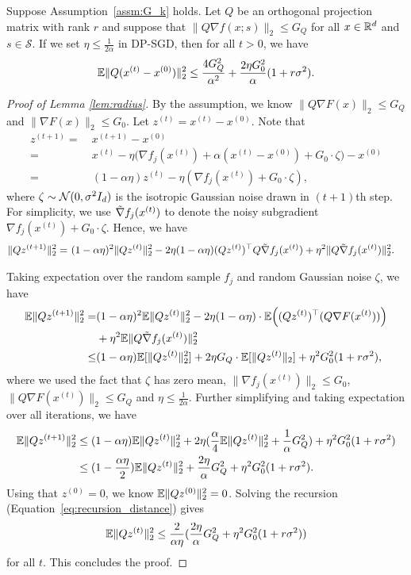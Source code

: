 \begin{lemm}
\label{lem:radius}
Suppose Assumption~\ref{assm:G_k} holds.
Let $Q$ be an orthogonal projection matrix with rank $r$ and suppose that $\|Q\nabla f(x;s)\|_2 \leq G_Q$ for all $x\in\mathbb{R}^d$ and $s \in \mathcal{S}$. 
If we set $\eta\leq\frac{1}{2\alpha}$ in DP-SGD, then for all $t>0$, we have
\[
\mathbb{E}\|Q(x^{(t)}-x^{(0)})\|_2^{2}\leq\frac{4 G_{Q}^{2}}{\alpha^{2}}+\frac{2\eta G_{0}^{2}}{\alpha}(1+r\sigma^{2}).
\]
\end{lemm}


\begin{proof}[Proof of Lemma \ref{lem:radius}]
By the assumption, we know $\|Q \nabla F(x)\|_2\le G_Q$ and $\| \nabla F(x)\|_2\leq G_0$.
Let $z^{(t)}=x^{(t)}-x^{(0)}$. Note that
\begin{align*}
    z^{(t+1)}=& ~ x^{(t+1)}-x^{(0)}\\
    =& ~ x^{(t)}-\eta\Big(\nabla f_j(x^{(t)})+\alpha(x^{(t)}-x^{(0)})+G_{0}\cdot \zeta\Big)-x^{(0)}\\
    =& ~ (1-\alpha\eta)z^{(t)}-\eta(\nabla f_{j}(x^{(t)})+G_{0}\cdot\zeta ),
\end{align*}
where $\zeta\sim \mathcal N(0,\sigma^{2}I_d)$ is the isotropic Gaussian noise drawn in $(t+1)$th step. 
For simplicity, we use $\Tilde{\nabla} f_j(x^{(t)})$ to denote the noisy subgradient $\nabla f_{j}(x^{(t)})+G_{0}\cdot\zeta$.
Hence, we have
\begin{align*}
    \|Qz^{(t+1)}\|_2^2=& ~ (1-\alpha\eta)^2\|Qz^{(t)}\|_2^2-2\eta(1-\alpha\eta)( Qz^{(t)})^\top Q\Tilde{\nabla} f_j(x^{(t)})+\eta^2\|Q\Tilde{\nabla} f_j(x^{(t)})\|_2^2.
\end{align*}

Taking expectation over the random sample $f_j$ and random Gaussian noise $\zeta$, we have
\begin{align*}
\mathbb{E}\|Qz^{(t+1)}\|_{2}^{2}= & (1-\alpha\eta)^{2}\mathbb{E}\|Qz^{(t)}\|_{2}^{2}-2\eta(1-\alpha\eta)\cdot\mathbb{E}\Big((Qz^{(t)})^{\top}(Q\nabla F(x^{(t)}))\Big) \\
 & +\eta^{2}\mathbb{E}\|Q\Tilde{\nabla} f_j(x^{(t)})\|_{2}^{2}\\
\leq & (1-\alpha\eta)\mathbb{E}[\|Qz^{(t)}\|_{2}^{2}]+2 \eta G_{Q}\cdot\mathbb{E}[\|Qz^{(t)}\|_{2}]+\eta^{2}G_{0}^{2}(1+r\sigma^{2}),
\end{align*}
where we used the fact that $\zeta$ has zero mean, $\|\nabla f_{j}(x^{(t)})\|_{2}\leq G_{0}$, $\|Q\nabla F(x^{(t)})\|_{2}\leq G_{Q}$ and $\eta\leq\frac{1}{2\alpha}$. 
Further simplifying and taking expectation over all iterations, we have
\begin{align}
\label{eq:recursion_distance}
\mathbb{E}\|Qz^{(t+1)}\|_{2}^{2} & \leq(1-\alpha\eta)\mathbb{E}\|Qz^{(t)}\|_{2}^{2}+2\eta(\frac{\alpha}{4}\mathbb{E}\|Qz^{(t)}\|_{2}^{2}+\frac{1}{\alpha}G_{Q}^{2})+\eta^{2}G_{0}^{2}(1+r\sigma^{2}) \nonumber\\
 & \leq(1-\frac{\alpha\eta}{2})\mathbb{E}\|Qz^{(t)}\|_{2}^{2}+\frac{2 \eta}{\alpha}G_{Q}^{2}+\eta^{2}G_{0}^{2}(1+r\sigma^{2}).
\end{align}
Using that $z^{(0)}=0$, we know $\mathbb{E}\|Qz^{(0)}\|_2^2=0$.
Solving the recursion (Equation~\eqref{eq:recursion_distance}) gives 
\[
\mathbb{E}\|Qz^{(t)}\|_{2}^{2}\leq\frac{2}{\alpha\eta}(\frac{2 \eta}{\alpha}G_{Q}^{2}+\eta^{2}G_{0}^{2}(1+r\sigma^{2}))
\]
for all $t$. 
This concludes the proof.
\end{proof}


